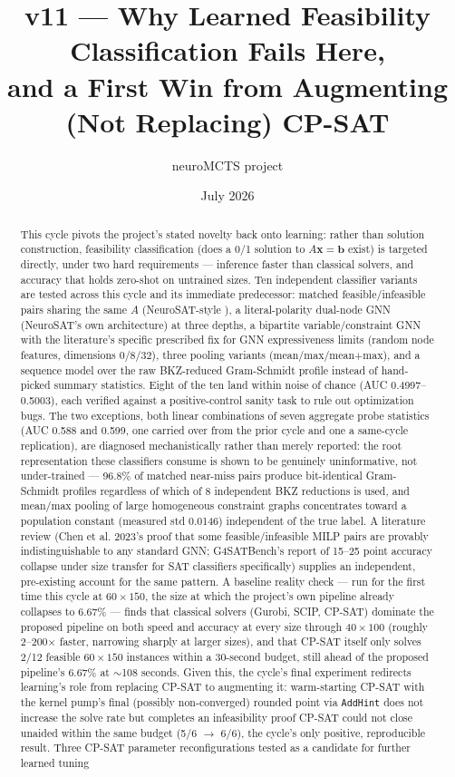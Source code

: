\documentclass[12pt]{article}
\title{v11 --- Why Learned Feasibility Classification Fails Here,\\
and a First Win from Augmenting (Not Replacing) CP-SAT}
\author{neuroMCTS project}
\date{July 2026}
\begin{document}
\maketitle

\begin{abstract}
This cycle pivots the project's stated novelty back onto learning: rather than solution construction, feasibility classification (does a 0/1 solution to $A\mathbf{x}=\mathbf{b}$ exist) is targeted directly, under two hard requirements --- inference faster than classical solvers, and accuracy that holds zero-shot on untrained sizes. Ten independent classifier variants are tested across this cycle and its immediate predecessor: matched feasible/infeasible pairs sharing the same $A$ (NeuroSAT-style \citep{selsam2019neurosat}), a literal-polarity dual-node GNN (NeuroSAT's own architecture) at three depths, a bipartite variable/constraint GNN with the literature's specific prescribed fix for GNN expressiveness limits (random node features, dimensions 0/8/32), three pooling variants (mean/max/mean+max), and a sequence model over the raw BKZ-reduced Gram-Schmidt profile instead of hand-picked summary statistics. Eight of the ten land within noise of chance (AUC 0.4997--0.5003), each verified against a positive-control sanity task to rule out optimization bugs. The two exceptions, both linear combinations of seven aggregate probe statistics (AUC 0.588 and 0.599, one carried over from the prior cycle and one a same-cycle replication), are diagnosed mechanistically rather than merely reported: the root representation these classifiers consume is shown to be genuinely uninformative, not under-trained --- 96.8\% of matched near-miss pairs produce bit-identical Gram-Schmidt profiles regardless of which of 8 independent BKZ reductions is used, and mean/max pooling of large homogeneous constraint graphs concentrates toward a population constant (measured std 0.0146) independent of the true label. A literature review (Chen et al. 2023's proof that some feasible/infeasible MILP pairs are provably indistinguishable to any standard GNN; G4SATBench's report of 15--25 point accuracy collapse under size transfer for SAT classifiers specifically) supplies an independent, pre-existing account for the same pattern. A baseline reality check --- run for the first time this cycle at $60\times150$, the size at which the project's own pipeline already collapses to 6.67\% --- finds that classical solvers (Gurobi, SCIP, CP-SAT) dominate the proposed pipeline on both speed and accuracy at every size through $40\times100$ (roughly 2--200$\times$ faster, narrowing sharply at larger sizes), and that CP-SAT itself only solves 2/12 feasible $60\times150$ instances within a 30-second budget, still ahead of the proposed pipeline's 6.67\% at $\sim$108 seconds. Given this, the cycle's final experiment redirects learning's role from replacing CP-SAT to augmenting it: warm-starting CP-SAT with the kernel pump's final (possibly non-converged) rounded point via \texttt{AddHint} does not increase the solve rate but completes an infeasibility proof CP-SAT could not close unaided within the same budget (5/6 $\to$ 6/6), the cycle's only positive, reproducible result. Three CP-SAT parameter reconfigurations tested as a candidate for further learned tuning 
\end{abstract}
\end{document}
